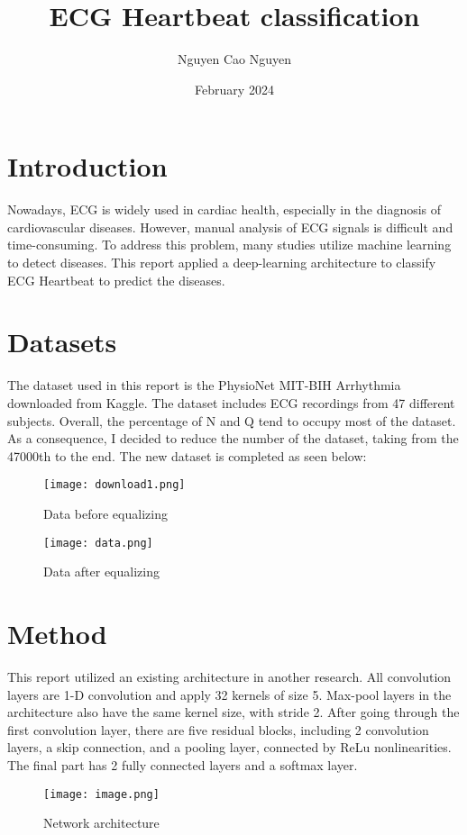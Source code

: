 \documentclass[hidelinks]{report}
\title{ECG Heartbeat classification}
\author{Nguyen Cao Nguyen}
\date{February 2024}
\begin{document}
\maketitle

\section{Introduction}
Nowadays, ECG is widely used in cardiac health, especially in the diagnosis of cardiovascular diseases. However, manual analysis of ECG signals is difficult and time-consuming. To address this problem,  many studies utilize machine learning to detect diseases. This report applied a deep-learning architecture to classify ECG Heartbeat to predict the diseases. 
\section{Datasets}
The dataset used in this report is the PhysioNet MIT-BIH Arrhythmia downloaded from Kaggle. The dataset includes ECG recordings from 47 different subjects. Overall, the percentage of N and Q tend to occupy most of the dataset.
As a consequence, I decided to reduce the number of the dataset, taking from the 47000th to the end. The new dataset is completed as seen below:
\begin{figure}[H]
    \centering
    \texttt{[image: download1.png]}
    \caption{Data before equalizing}
    \label{fig:enter-label}
\end{figure}
\begin{figure}
    \centering
    \texttt{[image: data.png]}
    \caption{Data after equalizing}
    \label{fig:enter-label}
\end{figure}
\pagebreak
\section{Method}
This report utilized an existing architecture in another research. All convolution layers are 1-D convolution and apply 32 kernels of size 5. Max-pool layers in the architecture also have the same kernel size, with stride 2. After going through the first convolution layer, there are five residual blocks, including 2 convolution layers, a skip connection, and a pooling layer, connected by ReLu nonlinearities. The final part has 2 fully connected layers and a softmax layer. 
\begin{figure}[H]
    \centering
    \texttt{[image: image.png]}
    \caption{Network architecture}
    \label{fig:enter-label}
\end{figure}
\pagebreak
\end{document}
